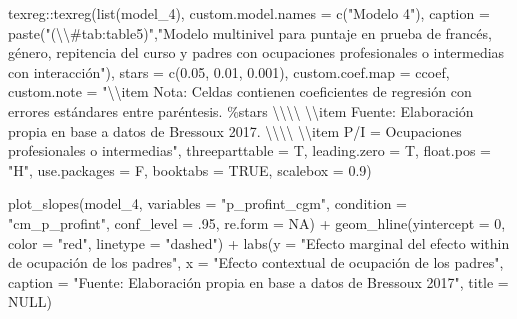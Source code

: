 \documentclass[
  12pt,
  a4paper,
]{article}
\newenvironment{Shaded}{\begin{snugshade}}{\end{snugshade}}
\newcommand{\AttributeTok}[1]{\textcolor[rgb]{0.77,0.63,0.00}{#1}}
\newcommand{\ConstantTok}[1]{\textcolor[rgb]{0.00,0.00,0.00}{#1}}
\newcommand{\DecValTok}[1]{\textcolor[rgb]{0.00,0.00,0.81}{#1}}
\newcommand{\FloatTok}[1]{\textcolor[rgb]{0.00,0.00,0.81}{#1}}
\newcommand{\FunctionTok}[1]{\textcolor[rgb]{0.00,0.00,0.00}{#1}}
\newcommand{\NormalTok}[1]{#1}
\newcommand{\SpecialCharTok}[1]{\textcolor[rgb]{0.00,0.00,0.00}{#1}}
\newcommand{\StringTok}[1]{\textcolor[rgb]{0.31,0.60,0.02}{#1}}
\begin{document}
\begin{Shaded}
\begin{Highlighting}[]
\NormalTok{texreg}\SpecialCharTok{::}\FunctionTok{texreg}\NormalTok{(}\FunctionTok{list}\NormalTok{(model\_4),}
               \AttributeTok{custom.model.names =} \FunctionTok{c}\NormalTok{(}\StringTok{"Modelo 4"}\NormalTok{),}
               \AttributeTok{caption =} \FunctionTok{paste}\NormalTok{(}\StringTok{"(}\SpecialCharTok{\textbackslash{}\textbackslash{}}\StringTok{\#tab:table5)"}\NormalTok{,}\StringTok{"Modelo multinivel para puntaje en prueba de francés, género, repitencia del curso y padres con ocupaciones profesionales o intermedias con interacción"}\NormalTok{),}
               \AttributeTok{stars =} \FunctionTok{c}\NormalTok{(}\FloatTok{0.05}\NormalTok{, }\FloatTok{0.01}\NormalTok{, }\FloatTok{0.001}\NormalTok{),}
               \AttributeTok{custom.coef.map =}\NormalTok{ ccoef,}
               \AttributeTok{custom.note =} \StringTok{"}\SpecialCharTok{\textbackslash{}\textbackslash{}}\StringTok{item Nota: Celdas contienen coeficientes de regresión con errores estándares entre paréntesis. \%stars }\SpecialCharTok{\textbackslash{}\textbackslash{}\textbackslash{}\textbackslash{}}\StringTok{ }\SpecialCharTok{\textbackslash{}\textbackslash{}}\StringTok{item Fuente: Elaboración propia en base a datos de Bressoux 2017. }\SpecialCharTok{\textbackslash{}\textbackslash{}\textbackslash{}\textbackslash{}}\StringTok{ }\SpecialCharTok{\textbackslash{}\textbackslash{}}\StringTok{item P/I = Ocupaciones profesionales o intermedias"}\NormalTok{,}
               \AttributeTok{threeparttable =}\NormalTok{ T,}
               \AttributeTok{leading.zero =}\NormalTok{ T,}
               \AttributeTok{float.pos =} \StringTok{"H"}\NormalTok{,}
               \AttributeTok{use.packages =}\NormalTok{ F,}
               \AttributeTok{booktabs =} \ConstantTok{TRUE}\NormalTok{,}
               \AttributeTok{scalebox =} \FloatTok{0.9}\NormalTok{)}



\FunctionTok{plot\_slopes}\NormalTok{(model\_4, }
            \AttributeTok{variables =} \StringTok{"p\_profint\_cgm"}\NormalTok{, }
            \AttributeTok{condition =} \StringTok{"cm\_p\_profint"}\NormalTok{,}
            \AttributeTok{conf\_level =}\NormalTok{ .}\DecValTok{95}\NormalTok{,}
            \AttributeTok{re.form =} \ConstantTok{NA}\NormalTok{) }\SpecialCharTok{+}
  \FunctionTok{geom\_hline}\NormalTok{(}\AttributeTok{yintercept =} \DecValTok{0}\NormalTok{, }
             \AttributeTok{color =} \StringTok{"red"}\NormalTok{, }
             \AttributeTok{linetype =} \StringTok{"dashed"}\NormalTok{) }\SpecialCharTok{+}
  \FunctionTok{labs}\NormalTok{(}\AttributeTok{y =} \StringTok{"Efecto marginal del efecto within de ocupación de los padres"}\NormalTok{,}
       \AttributeTok{x =} \StringTok{"Efecto contextual de ocupación de los padres"}\NormalTok{,}
       \AttributeTok{caption =} \StringTok{"Fuente: Elaboración propia en base a datos de Bressoux 2017"}\NormalTok{,}
       \AttributeTok{title =} \ConstantTok{NULL}\NormalTok{)}


\end{Highlighting}
\end{Shaded}
\end{document}
